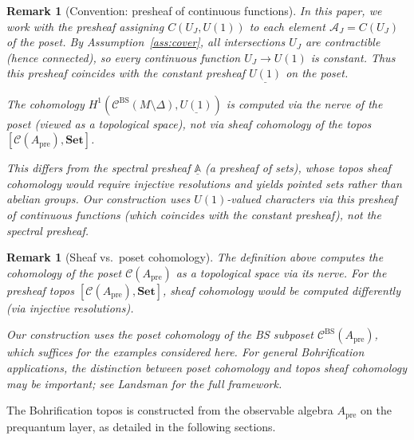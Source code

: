 \documentclass[11pt]{article}
\newtheorem{remark}[theorem]{Remark}
\begin{document}
\begin{remark}[Convention: presheaf of continuous functions]
\label{rem:convention}
In this paper, we work with the presheaf assigning $C(U_J, U(1))$ to each
element $\mathcal{A}_J = C(U_J)$ of the poset. By Assumption~\ref{ass:cover},
all intersections $U_J$ are contractible (hence connected), so every continuous
function $U_J \to U(1)$ is constant. Thus this presheaf coincides with the
constant presheaf $\underline{U(1)}$ on the poset.

The cohomology $H^1(\mathcal{C}^{\mathrm{BS}}(M \setminus \Delta), \underline{U(1)})$
is computed via the nerve of the poset (viewed as a topological space),
not via sheaf cohomology of the topos $[\mathcal{C}(A_{\mathrm{pre}}), \mathbf{Set}]$.

This differs from the spectral presheaf $\underline{\mathbb{A}}$ (a presheaf of
\emph{sets}), whose topos sheaf cohomology would require injective resolutions
and yields pointed sets rather than abelian groups. Our construction uses
$U(1)$-valued characters via this presheaf of continuous functions (which
coincides with the constant presheaf), not the spectral presheaf.
\end{remark}

\begin{remark}[Sheaf vs.\ poset cohomology]
\label{rem:sheaf-poset}
The definition above computes the cohomology of the poset $\mathcal{C}(A_{\mathrm{pre}})$
as a topological space via its nerve. For the presheaf topos
$[\mathcal{C}(A_{\mathrm{pre}}), \mathbf{Set}]$, sheaf cohomology would be computed
differently (via injective resolutions).

Our construction uses the poset cohomology of the BS subposet
$\mathcal{C}^{\mathrm{BS}}(A_{\mathrm{pre}})$, which suffices for the examples considered
here. For general Bohrification applications, the distinction between
poset cohomology and topos sheaf cohomology may be important; see
Landsman \cite{Lan16} for the full framework.
\end{remark}

The Bohrification topos is constructed from the observable algebra
$A_{\mathrm{pre}}$ on the prequantum layer, as detailed in the following
sections.
\end{document}
